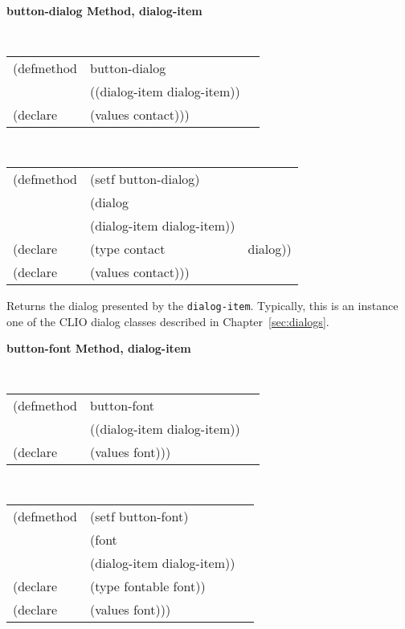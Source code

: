 {\samepage  
{\large {\bf button-dialog \hfill Method, dialog-item}}
\begin{flushright} \parbox[t]{6.125in}{
\tt
\begin{tabular}{lll}
\raggedright
(defmethod & button-dialog & \\
& ((dialog-item  dialog-item)) \\
(declare & (values contact)))
\end{tabular}
\rm

}\end{flushright}}

{\samepage
\begin{flushright} \parbox[t]{6.125in}{
\tt
\begin{tabular}{lll}
\raggedright
(defmethod & (setf button-dialog) & \\
         & (dialog\\
         & (dialog-item dialog-item)) \\
(declare &(type contact & dialog))\\
(declare &(values contact)))
\end{tabular}
\rm
}
\end{flushright}}



\begin{flushright} \parbox[t]{6.125in}{
Returns the dialog presented by the {\tt dialog-item}. 
Typically, this is an instance one of the CLIO dialog classes described in
Chapter~\ref{sec:dialogs}.} \end{flushright}

{\samepage  
{\large {\bf button-font \hfill Method, dialog-item}}
\begin{flushright} \parbox[t]{6.125in}{
\tt
\begin{tabular}{lll}
\raggedright
(defmethod & button-font & \\
& ((dialog-item  dialog-item)) \\
(declare & (values font)))
\end{tabular}
\rm

}\end{flushright}}

\begin{flushright} \parbox[t]{6.125in}{
\tt
\begin{tabular}{lll}
\raggedright
(defmethod & (setf button-font) & \\
         & (font \\
         & (dialog-item  dialog-item)) \\
(declare &(type fontable  font))\\
(declare & (values font)))
\end{tabular}
\rm}
\end{flushright}


